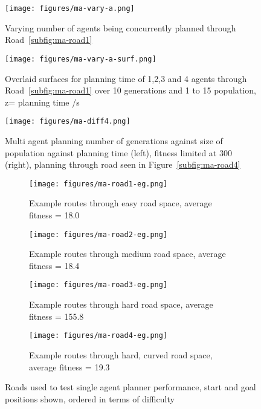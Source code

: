 \begin{figure}[ht]
  \centering
  \texttt{[image: figures/ma-vary-a.png]}
  \caption{\label{fig:ma-vary-a} Varying number of agents being concurrently planned through Road~\ref{subfig:ma-road1}}
\end{figure}

\begin{figure}[ht]
  \centering
  \texttt{[image: figures/ma-vary-a-surf.png]}
  \caption{\label{fig:ma-vary-a-surf} Overlaid surfaces for planning time of 1,2,3 and 4 agents through Road~\ref{subfig:ma-road1} over 10 generations and 1 to 15 population, z= planning time /s}
\end{figure}

\begin{figure}[ht]
  \centering
  \texttt{[image: figures/ma-diff4.png]}
  \caption{\label{fig:ma-diff4} Multi agent planning number of generations against size of population against planning time (left), fitness limited at 300 (right), planning through road seen in Figure~\ref{subfig:ma-road4}}
\end{figure}

\begin{figure}
  \centering
  \begin{subfigure}[b]{0.44\textwidth}
    \centering
    \texttt{[image: figures/ma-road1-eg.png]}
    \caption{\label{subfig:ma-road1-eg}Example routes through easy road space, average fitness = 18.0 }
  \end{subfigure}
  \begin{subfigure}[b]{0.44\textwidth}
    \centering
    \texttt{[image: figures/ma-road2-eg.png]}
    \caption{\label{subfig:ma-road2-eg}Example routes through medium road space, average fitness = 18.4 }
  \end{subfigure}
  \begin{subfigure}[b]{0.44\textwidth}
    \centering
    \texttt{[image: figures/ma-road3-eg.png]}
    \caption{\label{subfig:ma-road3-eg}Example routes through hard road space, average fitness = 155.8}
  \end{subfigure}
  \begin{subfigure}[b]{0.44\textwidth}
    \centering
    \texttt{[image: figures/ma-road4-eg.png]}
    \caption{\label{subfig:ma-road4-eg}Example routes through hard, curved road space, average fitness = 19.3 }
  \end{subfigure}
  \caption{\label{fig:multi-agent-roads-egs} Roads used to test single agent planner performance, start and goal positions shown, ordered in terms of difficulty}
\end{figure}


